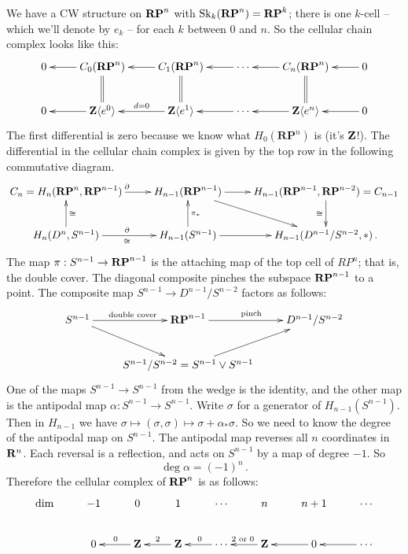 We have a CW structure on $\mathbf{RP}^n$ with $\mathrm{Sk}_k(\mathbf{RP}^n)=\mathbf{RP}^k$;
there is one $k$-cell -- which we'll denote by $e_k$ -- for each $k$ between $0$ and $n$. So the cellular chain complex looks like this:
\begin{equation*}
\xymatrix{0  & C_0(\mathbf{RP}^n)\ar@{=}[d]\ar[l] & C_1(\mathbf{RP}^n)\ar@{=}[d]\ar[l] & \cdots\ar[l] & C_n(\mathbf{RP}^n)\ar@{=}[d]\ar[l] & 0 \ar[l]\\
0 & \Z\langle e^0\rangle \ar[l] & \Z\langle e^1\rangle\ar[l]_{d=0} & \cdots\ar[l] & \Z\langle e^n\rangle\ar[l] & 0 \ar[l] }
\end{equation*}
The first differential is zero because we know what $ H_0(\mathbf{RP}^n)$ is (it's $\mathbf Z$!). The differential in the cellular chain complex is given by the top
row in the following commutative diagram.
\begin{equation*}
\xymatrix{C_n= H_n(\mathbf{RP}^n,\mathbf{RP}^{n-1})\ar[r]^\partial & 
H_{n-1}(\mathbf{RP}^{n-1}) \ar[r] \ar[dr] & 
H_{n-1}(\mathbf{RP}^{n-1},\mathbf{RP}^{n-2})=C_{n-1} \ar[d]_{\cong} \\
H_n(D^n,S^{n-1}) \ar[u]_\cong \ar[r]^\partial_\cong & 
H_{n-1}(S^{n-1}) \ar[u]_{\pi_*} \ar[r] & H_{n-1}(D^{n-1}/S^{n-2},\ast)\,.
}
\end{equation*}
The map $\pi:S^{n-1}\to\mathbf{RP}^{n-1}$ is the attaching map of the top cell of $RP^n$; that is, the double cover. The diagonal composite pinches the subspace 
$\mathbf{RP}^{n-1}$ to a point. The composite map $S^{n-1}\to D^{n-1}/S^{n-2}$ 
factors as follows: 
\begin{equation*}
\xymatrix{S^{n-1}\ar[r]^{\text{double cover}}\ar[dr] & \mathbf{RP}^{n-1}\ar[r]^{\text{pinch}} & D^{n-1}/S^{n-2}\\
 & S^{n-1}/S^{n-2}=S^{n-1}\vee S^{n-1}\ar[ur]}
\end{equation*}
One of the maps $S^{n-1}\to S^{n-1}$ from the wedge is the identity, and the other map is the antipodal map $\alpha:S^{n-1}\to S^{n-1}$. Write $\sigma$ for a generator of $ H_{n-1}(S^{n-1})$. Then in $H_{n-1}$ we have $\sigma\mapsto (\sigma,\sigma)\mapsto \sigma+\alpha_\ast\sigma$. So we need to know the degree of the antipodal map on $S^{n-1}$. The antipodal map reverses all $n$ coordinates in $\mathbf R^n$. Each reversal is a reflection, and acts on $S^{n-1}$ by a map of degree $-1$. So 
\[
\deg\alpha=(-1)^n\,.
\]
Therefore the cellular complex of $\mathbf{RP}^n$ is as follows: 
\begin{equation*}
\xymatrix{\hbox{dim} & -1 & 0 & 1 & \cdots & n & n+1 & \cdots \\
& 0 & \Z\ar[l]_0 & \Z\ar[l]_2 & \cdots\ar[l]_0 & \Z\ar[l]_{2\text{ or }0} & 0\ar[l] & \cdots\ar[l]}
\end{equation*}
